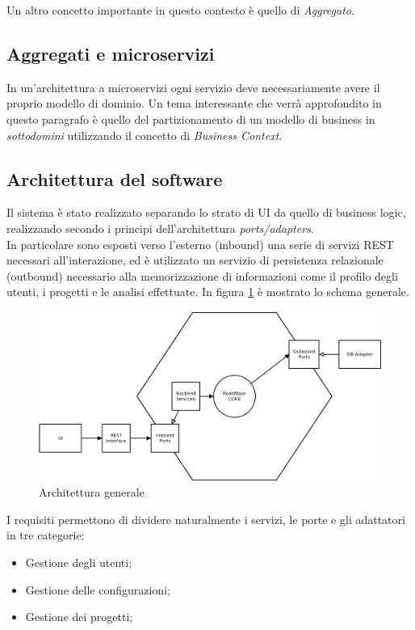 Un altro concetto importante in questo contesto è quello di \textit{Aggregato}.

\subsection{Aggregati e microservizi}
In un'architettura a microservizi ogni servizio deve necessariamente avere il proprio modello di dominio.
Un tema interessante che verrà approfondito in questo paragrafo è quello del partizionamento di un modello di business in \textit{sottodomini} utilizzando il concetto di \textit{Business Context}.

\subsection{Architettura del software}
Il sistema è stato realizzato separando lo strato di UI da quello di business logic, realizzando secondo i principi dell'architettura \textit{ports/adapters}.\\
In particolare sono esposti verso l'esterno (inbound) una serie di servizi REST necessari all'interazione, ed è utilizzato un servizio di persistenza relazionale (outbound) necessario alla memorizzazione di informazioni come il profilo degli utenti, i progetti e le analisi effettuate.
In figura \ref{fig:architecture00} è mostrato lo schema generale.

\begin{figure}[h]
	\centering
	\includegraphics[width=\textwidth]{img/architecture00}
	\caption{Architettura generale}
	\label{fig:architecture00}
\end{figure}

I requisiti permettono di dividere naturalmente i servizi, le porte e gli adattatori in tre categorie:
\begin{itemize}
	\item Gestione degli utenti;
	\item Gestione delle configurazioni;
	\item Gestione dei progetti;
\end{itemize}

